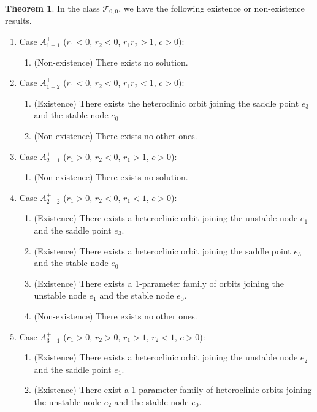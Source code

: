 \documentclass{amsart}
\theoremstyle{definition}
\newtheorem{thm1}{Theorem}[section]
\numberwithin{equation}{section}
\begin{document}
\begin{thm1} \label{main} In the class $\mathcal{T}_{0,0}$, we have the following existence or non-existence results.

\begin{enumerate}
 \item Case $A_{1-1}^+$ ($r_1<0$, $r_2<0$, $r_1r_2>1$, $c>0$):
 \begin{enumerate}
  \item (Non-existence) There exists no solution.
 \end{enumerate}
 \item Case $A_{1-2}^+$ ($r_1<0$, $r_2<0$, $r_1r_2<1$, $c>0$):
 \begin{enumerate}
  \item (Existence) There exists the heteroclinic orbit joining the saddle point $e_3$ and the stable node $e_0$
  \item (Non-existence) There exists no other ones.
 \end{enumerate}
 \item Case $A_{2-1}^+$ ($r_1>0$, $r_2<0$, $r_1 >1$, $c>0$):
 \begin{enumerate}
  \item (Non-existence) There exists no solution.
 \end{enumerate}
 \item Case $A_{2-2}^+$  ($r_1>0$, $r_2<0$, $r_1<1$, $c>0$):
 \begin{enumerate}
  \item (Existence) There exists a heteroclinic orbit joining the unstable node $e_1$ and the saddle point $e_3$. 
  \item (Existence) There exists a heteroclinic orbit joining the saddle point $e_3$ and the stable node $e_0$
  \item (Existence) There exists a 1-parameter family of orbits joining the unstable node $e_1$ and the stable node $e_0$.
  \item (Non-existence) There exists no other ones.
 \end{enumerate}
 \item Case $A_{3-1}^+$ ($r_1>0$, $r_2>0$, $r_1 >1$, $r_2<1$, $c>0$):
 \begin{enumerate}
   \item (Existence) There exists a heteroclinic orbit joining the unstable node $e_2$ and the saddle point $e_1$.
   \item (Existence) There exist a 1-parameter family of heteroclinic orbits joining the unstable node  $e_2$ and the stable node $e_0$.

\end{enumerate}
\end{enumerate}
\end{thm1}
\end{document}
